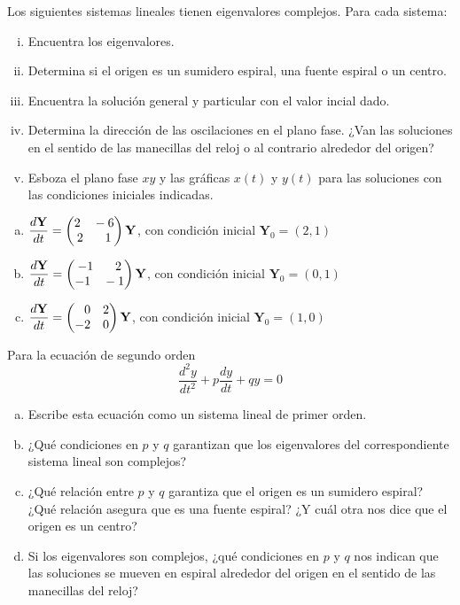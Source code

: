 \documentclass[12pt]{exam}
\newcommand*\colvec[3][]{
    \begin{pmatrix}\ifx\relax#1\relax\else#1\\\fi#2\\#3\end{pmatrix}
}
\begin{document}
\begin{questions}
     \question%
     Los siguientes sistemas lineales tienen eigenvalores complejos. Para cada sistema:
     \begin{enumerate}[i)]
         \item Encuentra los eigenvalores.
         \item Determina si el origen es un sumidero espiral, una fuente espiral o un centro.
         \item Encuentra la solución general y particular con el valor incial dado.
         \item Determina la dirección de las oscilaciones en el plano fase. ¿Van las soluciones en el sentido de las manecillas del reloj o al contrario alrededor del origen?
         \item Esboza el plano fase $xy$ y las gráficas $x(t)$ y $y(t)$ para las soluciones con las condiciones iniciales indicadas.
     \end{enumerate}
     \vskip20pt
     \begin{enumerate}[a)]
         \item $\dfrac{d\mathbf{Y}}{dt}=\colvec{2\quad-6}{2\quad\phantom{-}1}\mathbf{Y}$, con condición inicial $\mathbf{Y}_0=(2,1)$
         \item $\dfrac{d\mathbf{Y}}{dt}=\colvec{-1\quad\phantom{-}2}{-1\quad-1}\mathbf{Y}$, con condición inicial $\mathbf{Y}_0=(0,1)$
         \item $\dfrac{d\mathbf{Y}}{dt}=\colvec{\phantom{-}0\quad2}{-2\quad0}\mathbf{Y}$, con condición inicial $\mathbf{Y}_0=(1,0)$
     \end{enumerate}



     \question%
     Para la ecuación de segundo orden $$\frac{d^2y}{dt^2}+p\frac{dy}{dt}+qy=0$$
     \begin{enumerate}[a)]
         \item Escribe esta ecuación como un sistema lineal de primer orden.
         \item ¿Qué condiciones en $p$ y $q$ garantizan que los eigenvalores del correspondiente sistema lineal son complejos?
         \item ¿Qué relación entre $p$ y $q$ garantiza que el origen es un sumidero espiral? ¿Qué relación asegura que es una fuente espiral? ¿Y cuál otra nos dice que el origen es un centro?
         \item Si los eigenvalores son complejos, ¿qué condiciones en $p$ y $q$ nos indican que las soluciones se mueven en espiral alrededor del origen en el sentido de las manecillas del reloj?
     \end{enumerate}



\end{questions}
\end{document}
